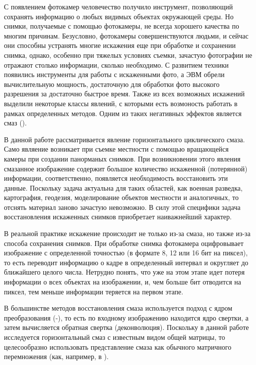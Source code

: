 \documentclass[a4paper]{article}
\theoremstyle{definition}
\begin{document}
    С появлением фотокамер человечество получило инструмент, позволяющий сохранять информацию о любых видимых объектах окружающей среды. Но снимки, получаемые с помощью фотокамеры, не всегда хорошего качества по многим причинам. Безусловно, фотокамеры совершенствуются людьми, и сейчас они способны устранять многие искажения еще при обработке и сохранении снимка, однако, особенно при тяжелых условиях съемки, зачастую фотографии не отражают столько информации, сколько необходимо. С развитием техники появились инструменты для работы с искаженными фото, а ЭВМ обрели вычислительную мощность, достаточную для обработки фото высокого разрешения за достаточно быстрое время. Также из всех возможных искажений выделили некоторые классы явлений, с которыми есть возмоность работать в рамках определенных методов. Одним из таких негативных эффектов является смаз (\cite{blur_def}).


    В данной работе рассматривается явление горизонтального циклического смаза. Само являение возникает при съемке местности с помощью вращающейся камеры при создании панорманых снимков. При возникновении этого явления смазанное изображение содержит большое количество искаженной (потерянной) информации, соответственно, появляется необходимость восстановить эти данные. Поскольку задача актуальна для таких областей, как военная разведка, картография, геодезия, моделирование объектов местности и аналогичных, то отснять материал заново зачастую невозможно. В силу этой специфики задача восстановления искаженных снимков приобретает наиважнейший характер.


    В реальной практике искажение происходит не только из-за смаза, но также из-за способа сохранения снимков. При обработке снимка фотокамера оцифровывает изображение с определенной точностью (в формате 8, 12 или 16 бит на пиксел), то есть переводит информацию о кадре в определенный интервал и округляет до ближайшего целого числа. Нетрудно понять, что уже на этом этапе идет потеря информации о всех объектах на изображении, и, чем больше бит отводится на пиксел, тем меньше информации теряется на первом этапе.


    В большинстве методов восстановления смаза используется подход с ядром преобразования (\cite{kernel1}-\cite{kernel2}), то есть по входному изображению находится ядро свертки, а затем вычисляется обратная свертка (деконволюция). Поскольку в данной работе исследуется горизонтальный смаз с известным видом общей матрицы, то целесообразно использовать представление смаза как обычного матричного перемножения (как, например, в \cite{model_proc}).
\end{document}
